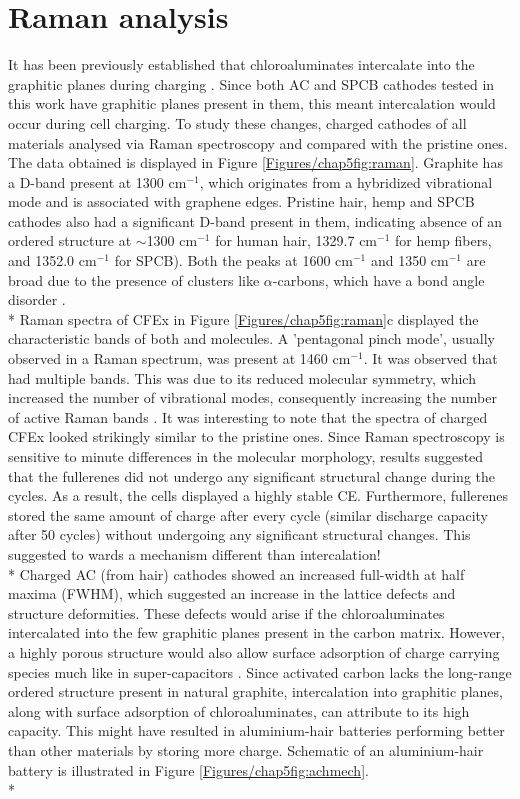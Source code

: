 \section*{Raman analysis}
It has been previously established that chloroaluminates intercalate into the graphitic planes during charging \cite{lin_ultrafast_2015}. Since both AC and SPCB cathodes tested in this work have graphitic planes present in them, this meant intercalation would occur during cell charging. To study these changes, charged cathodes of all materials analysed via Raman spectroscopy and compared with the pristine ones. The data obtained is displayed in Figure \ref{Figures/chap5fig:raman}. Graphite has a D-band present at 1300 cm$^{-1}$, which originates from a hybridized vibrational mode and is associated with graphene edges. Pristine hair, hemp and SPCB cathodes also had a significant D-band present in them, indicating absence of an ordered structure at $\sim$1300 cm$^{-1}$ for human hair, 1329.7 cm$^{-1}$ for hemp fibers, and 1352.0 cm$^{-1}$ for SPCB). Both the peaks at 1600 cm$^{-1}$ and 1350 cm$^{-1}$ are broad due to the presence of  clusters like $\alpha$-carbons, which have a bond angle disorder \cite{shimodaira_raman_2002}.\\*
Raman spectra of CFEx in Figure \ref{Figures/chap5fig:raman}c displayed the characteristic bands of both  and  molecules. A 'pentagonal pinch mode', usually observed in a  Raman spectrum, was present at 1460 cm$^{-1}$. It was observed that  had multiple bands. This was due to its reduced molecular symmetry, which increased the number of vibrational modes, consequently increasing the number of active Raman bands \cite{kimbrell_analysis_2014}. It was interesting to note that the spectra of charged CFEx looked strikingly similar to the pristine ones. Since Raman spectroscopy is sensitive to minute differences in the molecular morphology, results suggested that the fullerenes did not undergo any significant structural change during the cycles. As a result, the cells displayed a highly stable CE. Furthermore, fullerenes stored the same amount of charge after every cycle (similar discharge capacity after 50 cycles) without undergoing any significant structural changes. This suggested to wards a mechanism different than intercalation!\\* 
Charged AC (from hair) cathodes showed an increased full-width at half maxima (FWHM), which suggested an increase in the lattice defects and structure deformities. These defects would arise if the chloroaluminates intercalated into the few graphitic planes present in the carbon matrix. However, a highly porous structure would also allow surface adsorption of charge carrying species much like in super-capacitors \cite{beguin_carbons_2014}. Since activated carbon lacks the long-range ordered structure present in natural graphite, intercalation into graphitic planes, along with surface adsorption of chloroaluminates, can attribute to its high capacity\cite{brezesinski_ordered_2010}. This might have resulted in aluminium-hair batteries performing better than other materials by storing more charge. Schematic of an aluminium-hair battery is illustrated in Figure \ref{Figures/chap5fig:achmech}.\\*

